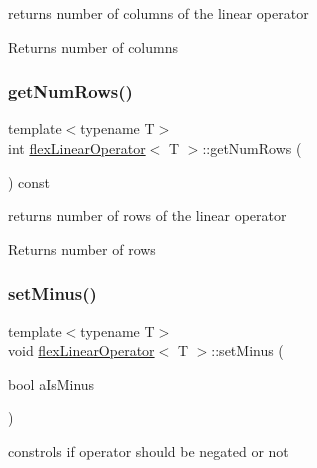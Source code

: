 returns number of columns of the linear operator 

\begin{DoxyReturn}{Returns}
number of columns 
\end{DoxyReturn}
\mbox{\label{classflex_linear_operator_a6f807b6a0549a79cb22598ab0c42ef21}} 
\subsubsection{\texorpdfstring{get\+Num\+Rows()}{getNumRows()}}
{\footnotesize\ttfamily template$<$typename T$>$ \\
int \hyperlink{classflex_linear_operator}{flex\+Linear\+Operator}$<$ T $>$\+::get\+Num\+Rows (\begin{DoxyParamCaption}{ }\end{DoxyParamCaption}) const\hspace{0.3cm}{\ttfamily [inline]}}



returns number of rows of the linear operator 

\begin{DoxyReturn}{Returns}
number of rows 
\end{DoxyReturn}
\mbox{\label{classflex_linear_operator_a0757a5f739ef85162cfc95e40eeb7784}} 
\subsubsection{\texorpdfstring{set\+Minus()}{setMinus()}}
{\footnotesize\ttfamily template$<$typename T$>$ \\
void \hyperlink{classflex_linear_operator}{flex\+Linear\+Operator}$<$ T $>$\+::set\+Minus (\begin{DoxyParamCaption}\item[{bool}]{a\+Is\+Minus }\end{DoxyParamCaption})\hspace{0.3cm}{\ttfamily [inline]}}



constrols if operator should be negated or not 


